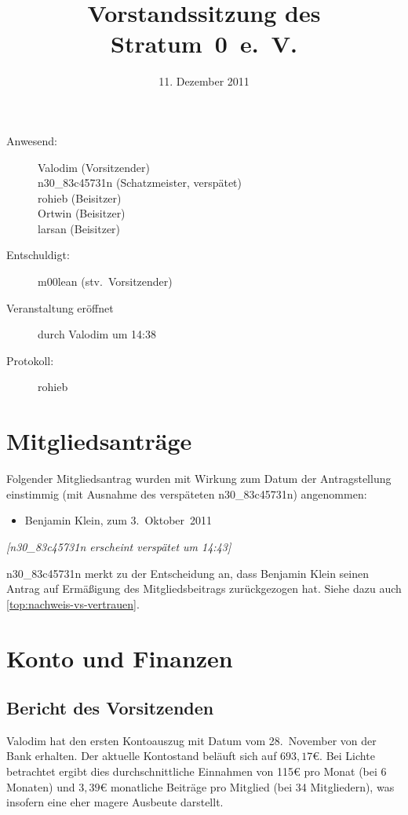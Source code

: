 \documentclass[a4paper,12pt]{scrartcl}
\title{Vorstandssitzung des Stratum~0~e.~V.}
\date{11. Dezember 2011}
\begin{document}
\maketitle

\begin{description}
 \item[Anwesend:] Valodim (Vorsitzender) \\
    n30\_83c45731n (Schatzmeister, verspätet) \\
    rohieb (Beisitzer) \\
    Ortwin (Beisitzer) \\
    larsan (Beisitzer)
  \item[Entschuldigt:] m00lean (stv.~Vorsitzender)
  \item[Veranstaltung eröffnet] durch Valodim um 14:38
  \item[Protokoll:] rohieb
\end{description}

\section{Mitgliedsanträge}
Folgender Mitgliedsantrag wurden mit Wirkung zum Datum der Antragstellung 
einstimmig (mit Ausnahme des verspäteten n30\_83c45731n) angenommen:
\begin{itemize}
 \item Benjamin Klein, zum 3.~Oktober~2011
\end{itemize}

\emph{[n30\_83c45731n erscheint verspätet um 14:43]}

n30\_83c45731n merkt zu der Entscheidung an, dass Benjamin Klein seinen Antrag
auf Ermäßigung des Mitgliedsbeitrags zurückgezogen hat. Siehe dazu auch 
\ref{top:nachweis-vs-vertrauen}.

\section{Konto und Finanzen}
\label{top:finanzen}
\subsection{Bericht des Vorsitzenden}
Valodim hat den ersten Kontoauszug mit Datum vom 28.~November von der Bank 
erhalten. Der aktuelle Kontostand beläuft sich auf $693{,}17$€. Bei Lichte 
betrachtet ergibt dies durchschnittliche Einnahmen von 115€ pro Monat (bei 
6 Monaten) und $3{,}39$€ monatliche Beiträge pro Mitglied (bei 34 Mitgliedern), 
was insofern eine eher magere Ausbeute darstellt.
\end{document}
